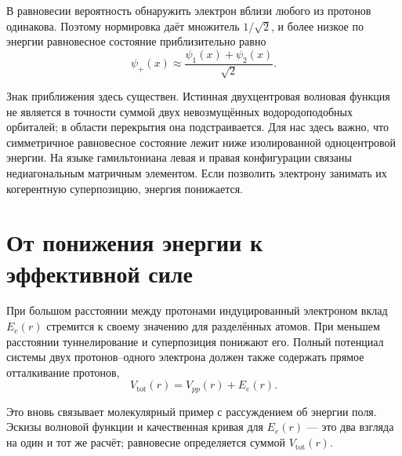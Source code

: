 В равновесии вероятность обнаружить электрон вблизи любого из протонов одинакова. Поэтому нормировка даёт множитель \(1/\sqrt2\), и более низкое по энергии равновесное состояние приблизительно равно
\begin{equation}
\psi_+(x)\approx \frac{\psi_1(x)+\psi_2(x)}{\sqrt2}.
\end{equation}

Знак приближения здесь существен. Истинная двухцентровая волновая функция не является в точности суммой двух невозмущённых водородоподобных орбиталей; в области перекрытия она подстраивается. Для нас здесь важно, что симметричное равновесное состояние лежит ниже изолированной одноцентровой энергии. На языке гамильтониана левая и правая конфигурации связаны недиагональным матричным элементом. Если позволить электрону занимать их когерентную суперпозицию, энергия понижается.

\section{От понижения энергии к эффективной силе}

При большом расстоянии между протонами индуцированный электроном вклад \(E_e(r)\) стремится к своему значению для разделённых атомов. При меньшем расстоянии туннелирование и суперпозиция понижают его. Полный потенциал системы двух протонов--одного электрона должен также содержать прямое отталкивание протонов,
\begin{equation}
V_{\mathrm{tot}}(r)=V_{pp}(r)+E_e(r).
\end{equation}

Это вновь связывает молекулярный пример с рассуждением об энергии поля. Эскизы волновой функции и качественная кривая для \(E_e(r)\) — это два взгляда на один и тот же расчёт; равновесие определяется суммой \(V_{\mathrm{tot}}(r)\).


